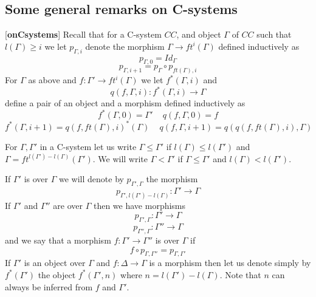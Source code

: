 \documentclass[11pt]{article}
\newcommand{\llabel}[1]{\label{#1}[{\bf #1}]}
\newcommand{\sr}{\rightarrow}
\newcommand{\wh}{\widehat}
\newcommand{\spc}{{\,\,\,\,\,\,\,}}
\begin{document}


\subsection{Some general remarks on C-systems}
\llabel{onCsystems}
%
Recall that for a C-system $CC$, and object $\Gamma$ of $CC$ such that $l(\Gamma)\ge i$ we let $p_{\Gamma,i}$ denote the morphism $\Gamma\sr ft^i(\Gamma)$ defined inductively as
%
$$p_{\Gamma,0}=Id_{\Gamma}$$
$$p_{\Gamma,i+1}=p_{\Gamma}\circ p_{ft(\Gamma),i}$$
%
For $\Gamma$ as above and $f:\Gamma'\sr ft^i(\Gamma)$ we let $f^*(\Gamma,i)$ and 
%
$$q(f,\Gamma,i):f^*(\Gamma,i)\sr \Gamma$$ 
%
define a pair of an object and a morphism defined inductively as
%
$$f^*(\Gamma,0)=\Gamma'\spc q(f,\Gamma,0)=f$$
$$f^*(\Gamma, i+1)=q(f,ft(\Gamma),i)^*(\Gamma)\spc q(f,\Gamma,i+1)=q(q(f,ft(\Gamma),i),\Gamma)$$
%

For $\Gamma,\Gamma'$ in a C-system let us write $\Gamma\le \Gamma'$ if $l(\Gamma)\le l(\Gamma')$ and $\Gamma=ft^{l(\Gamma')-l(\Gamma)}(\Gamma')$. We will write $\Gamma<\Gamma'$ if $\Gamma\le \Gamma'$ and $l(\Gamma)<l(\Gamma')$. 

If $\Gamma'$ is over $\Gamma$ we will denote by $p_{\Gamma',\Gamma}$ the morphism
%
$$p_{\Gamma',l(\Gamma')-l(\Gamma)}:\Gamma'\sr \Gamma$$
%
If $\Gamma'$ and $\Gamma''$ are over $\Gamma$ then we have morphisms 
%
$$p_{\Gamma',\Gamma}:\Gamma'\sr \Gamma$$
$$p_{\Gamma'',\Gamma}:\Gamma''\sr\Gamma$$
%
and we say that a morphism $f:\Gamma'\sr \Gamma''$ is over $\Gamma$ if 
%
$$f\circ p_{\Gamma,\Gamma''}=p_{\Gamma,\Gamma'}$$
%
If $\Gamma'$ is an object over $\Gamma$ and  $f:\Delta\sr \Gamma$ is a morphism then let us denote simply by $f^*(\Gamma')$ the object $f^*(\Gamma',n)$ where $n=l(\Gamma')-l(\Gamma)$. Note that $n$ can always be inferred from $f$ and $\Gamma'$. 
\end{document}
